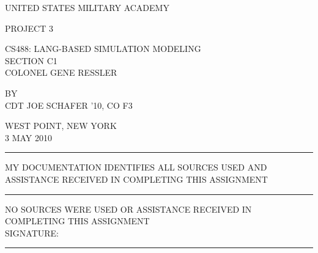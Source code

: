 \begin{titlepage}
  \begin{center}
    \singlespacing
    UNITED STATES MILITARY ACADEMY
    \vfill
    
    PROJECT 3

    \vfill
    
    CS488: LANG-BASED SIMULATION MODELING\\[12pt]
    SECTION C1\\[12pt]
    COLONEL GENE RESSLER

    \vfill
    
    BY\\[12pt]
    CDT JOE SCHAFER '10, CO F3

    \vfill
    
    WEST POINT, NEW YORK \\[12pt]
    3 MAY 2010
  \end{center}

  \vfill

  \begin{flushleft}
    \rule{24pt}{0.5pt}
    MY DOCUMENTATION IDENTIFIES ALL SOURCES USED AND ASSISTANCE
    RECEIVED IN COMPLETING THIS ASSIGNMENT
    \\[12pt]
    
    \rule{24pt}{0.5pt}
    NO SOURCES WERE USED OR ASSISTANCE RECEIVED IN COMPLETING THIS
    ASSIGNMENT
    \\[18pt]

    SIGNATURE: \rule{30em}{0.5pt}\\[12pt]
  \end{flushleft}
\end{titlepage}
